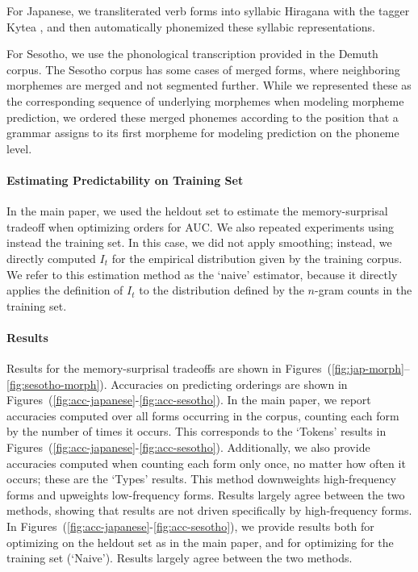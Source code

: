 \documentclass[11pt,letterpaper]{article}
\begin{document}
For Japanese, we transliterated verb forms into syllabic Hiragana with the tagger Kytea \citep{DBLP:conf/lrec/NeubigM10,DBLP:conf/acl/NeubigNM11}, and then automatically phonemized these syllabic representations.


For Sesotho, we use the phonological transcription provided in the Demuth corpus.
The Sesotho corpus has some cases of merged forms, where neighboring morphemes are merged and not segmented further.
While we represented these as the corresponding sequence of underlying morphemes when modeling morpheme prediction, we ordered these merged phonemes according to the position that a grammar assigns to its first morpheme for modeling prediction on the phoneme level.

\paragraph{Estimating Predictability on Training Set}
In the main paper, we used the heldout set to estimate the memory-surprisal tradeoff when optimizing orders for AUC.
We also repeated experiments using instead the training set.
In this case, we did not apply smoothing; instead, we directly computed $I_t$ for the empirical distribution given by the training corpus.
We refer to this estimation method as the `naive' estimator, because it directly applies the definition of $I_t$ to the distribution defined by the $n$-gram counts in the training set.

\paragraph{Results}
Results for the memory-surprisal tradeoffs are shown in Figures~(\ref{fig:jap-morph}--\ref{fig:sesotho-morph}).
Accuracies on predicting orderings are shown in Figures~(\ref{fig:acc-japanese}-\ref{fig:acc-sesotho}).
In the main paper, we report accuracies computed over all forms occurring in the corpus, counting each form by the number of times it occurs. This corresponds to the `Tokens' results in Figures~(\ref{fig:acc-japanese}-\ref{fig:acc-sesotho}).
Additionally, we also provide accuracies computed when counting each form only once, no matter how often it occurs; these are the `Types' results. This method downweights high-frequency forms and upweights low-frequency forms.
Results largely agree between the two methods, showing that results are not driven specifically by high-frequency forms.
In Figures~(\ref{fig:acc-japanese}-\ref{fig:acc-sesotho}), we provide results both for optimizing on the heldout set as in the main paper, and for optimizing for the training set (`Naive').
Results largely agree between the two methods.
\end{document}
